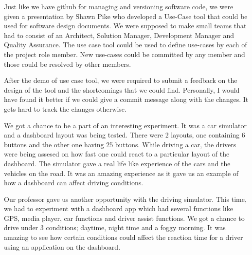 \documentclass[index=totoc,hyperref,openany]{labbook} %
\begin{document}

{\let\clearpage\relax {}}

Just like we have github for managing and versioning software code, we were given a presentation by Shawn Pike who developed a Use-Case tool that could be used for software design documents. We were supposed to make small teams that had to consist of an Architect, Solution Manager, Development Manager and Quality Assurance. The use case tool could be used to define use-cases by each of the project role member. New use-cases could be committed by any member and those could be resolved by other members.
\par After the demo of use case tool, we were required to submit a feedback on the design of the tool and the shortcomings that we could find. Personally, I would have found it better if we could give a commit message along with the changes. It gets hard to track the changes otherwise.


{\let\clearpage\relax {}}

We got a chance to be a part of an interesting experiment. It was a car simulator and a dashboard layout was being tested. There were 2 layouts, one containing 6 buttons and the other one having 25 buttons. While driving a car, the drivers were being assesed on how fast one could react to a particular layout of the dashboard. The simulator gave a real life like experience of the cars and the vehicles on the road. It was an amazing experience as it gave us an example of how a dashboard can affect driving conditions.

Our professor gave us another opportunity with the driving simulator. This time, we had to experiment with a dashboard app which had several functions like GPS, media player, car functions and driver assist functions. We got a chance to drive under 3 conditions; daytime, night time and a foggy morning. It was amazing to see how certain conditions could affect the reaction time for a driver using an application on the dashboard.
\end{document}
